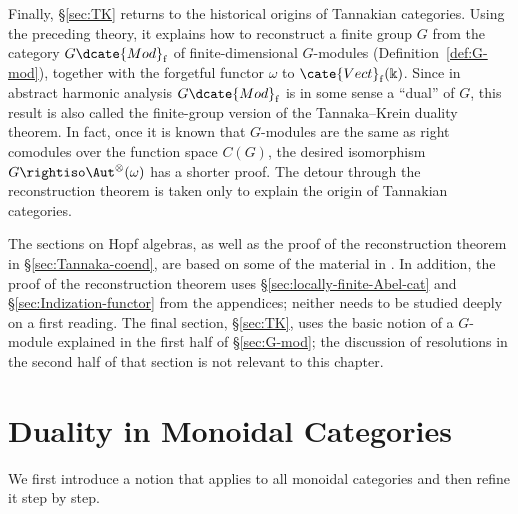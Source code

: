 Finally, \S\ref{sec:TK} returns to the historical origins of Tannakian
categories. Using the preceding theory, it explains how to reconstruct a
finite group $G$ from the category $G\dcate{Mod}_{\mathrm{f}}$ of
finite-dimensional $G$-modules (Definition~\ref{def:G-mod}), together with
the forgetful functor $\omega$ to $\cate{Vect}_{\mathrm{f}}(\Bbbk)$. Since
in abstract harmonic analysis $G\dcate{Mod}_{\mathrm{f}}$ is in some sense a
``dual'' of $G$, this result is also called the finite-group version of the
Tannaka--Krein duality theorem. In fact, once it is known that $G$-modules
are the same as right comodules over the function space $C(G)$, the desired
isomorphism $G\rightiso\Aut^\otimes(\omega)$ has a shorter proof. The detour
through the reconstruction theorem is taken only to explain the origin of
Tannakian categories.

\begin{wenxintishi}
	The sections on Hopf algebras, as well as the proof of the reconstruction
	theorem in \S\ref{sec:Tannaka-coend}, are based on some of the material in
	. In addition, the proof of the reconstruction theorem
	uses \S\ref{sec:locally-finite-Abel-cat} and
	\S\ref{sec:Indization-functor} from the appendices; neither needs to be
	studied deeply on a first reading. The final section, \S\ref{sec:TK}, uses
	the basic notion of a $G$-module explained in the first half of
	\S\ref{sec:G-mod}; the discussion of resolutions in the second half of
	that section is not relevant to this chapter.
\end{wenxintishi}

\section{Duality in Monoidal Categories}\label{sec:monoidal-dual}

We first introduce a notion that applies to all monoidal categories and then
refine it step by step.

